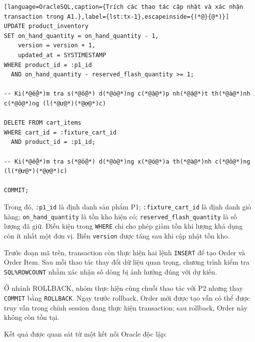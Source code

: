 \reportblockspace{72pt}
\begin{lstlisting}[language=OracleSQL,caption={Trích các thao tác cập nhật và xác nhận transaction trong A1.},label={lst:tx-1},escapeinside={(*@}{@*)}]
UPDATE product_inventory
SET on_hand_quantity = on_hand_quantity - 1,
    version = version + 1,
    updated_at = SYSTIMESTAMP
WHERE product_id = :p1_id
  AND on_hand_quantity - reserved_flash_quantity >= 1;

-- Ki(*@ể@*)m tra s(*@ố@*) d(*@ò@*)ng c(*@ậ@*)p nh(*@ậ@*)t th(*@à@*)nh c(*@ô@*)ng (l(*@ư@*)(*@ợ@*)c)

DELETE FROM cart_items
WHERE cart_id = :fixture_cart_id
  AND product_id = :p1_id;

-- Ki(*@ể@*)m tra s(*@ố@*) d(*@ò@*)ng x(*@ó@*)a th(*@à@*)nh c(*@ô@*)ng (l(*@ư@*)(*@ợ@*)c)

COMMIT;
\end{lstlisting}

Trong đó, \texttt{:\allowbreak{}p1\_\allowbreak{}id} là định danh sản phẩm P1; \texttt{:\allowbreak{}fixture\_\allowbreak{}cart\_\allowbreak{}id} là định danh giỏ hàng; \texttt{on\_\allowbreak{}hand\_\allowbreak{}quantity} là tồn kho hiện có; \texttt{reserved\_\allowbreak{}flash\_\allowbreak{}quantity} là số lượng đã giữ. Điều kiện trong \texttt{WHERE} chỉ cho phép giảm tồn khi lượng khả dụng còn ít nhất một đơn vị. Biến \texttt{version} được tăng sau khi cập nhật tồn kho.

Trước đoạn mã trên, transaction còn thực hiện hai lệnh \texttt{INSERT} để tạo Order và Order Item. Sau mỗi thao tác thay đổi dữ liệu quan trọng, chương trình kiểm tra \texttt{SQL\%ROWCOUNT} nhằm xác nhận số dòng bị ảnh hưởng đúng với dự kiến.

Ở nhánh ROLLBACK, nhóm thực hiện cùng chuỗi thao tác với P2 nhưng thay \texttt{COMMIT} bằng \texttt{ROLLBACK}. Ngay trước rollback, Order mới được tạo vẫn có thể được truy vấn trong chính session đang thực hiện transaction; sau rollback, Order này không còn tồn tại.

Kết quả được quan sát từ một kết nối Oracle độc lập:

